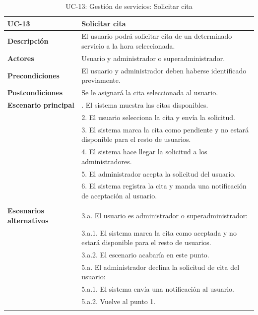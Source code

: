 \begin{table}[H]
  \begin{center}
    \begin{tabularx}{16.4cm}{|l|X|}
      \hline
      \textbf{UC-13} & \textbf{Solicitar cita}\\
      \hline
      \textbf{Descripción} & El usuario podrá solicitar cita de un determinado servicio a la hora seleccionada.\\
      \hline
      \textbf{Actores} & Usuario y administrador o superadministrador.\\
      \hline
      \textbf{Precondiciones} & El usuario y administrador deben haberse identificado previamente.\\
      \hline
      \textbf{Postcondiciones} & Se le asignará la cita seleccionada al usuario.\\
      \hline
      \textbf{Escenario principal} & \smallskip 1. El sistema muestra las citas disponibles.\\
      & 2. El usuario selecciona la cita y envía la solicitud.\\
      & 3. El sistema marca la cita como pendiente y no estará disponible para el resto de usuarios. \\
      & 4. El sistema hace llegar la solicitud a los administradores.\\
      & 5. El administrador acepta la solicitud del usuario.\\
      & 6. El sistema registra la cita y manda una notificación de aceptación al usuario.\\
      & \\
      \hline
      \textbf{Escenarios alternativos} & \smallskip 3.a. El usuario es administrador o superadministrador:\\
      & \hspace{0.3cm} 3.a.1. El sistema marca la cita como aceptada y no estará disponible para el resto de usuarios. \\
      & \hspace{0.3cm} 3.a.2. El escenario acabaría en este punto.\\
      & \smallskip 5.a. El administrador declina la solicitud de cita del usuario:\\
      & \hspace{0.3cm} 5.a.1. El sistema envía una notificación al usuario.\\
      & \hspace{0.3cm} 5.a.2. Vuelve al punto 1.\\
      & \\
      \hline
    \end{tabularx}
    \caption{UC-13: Gestión de servicios: Solicitar cita}
    \label{tab:CU-solicitar-cita}
  \end{center}
\end{table}


